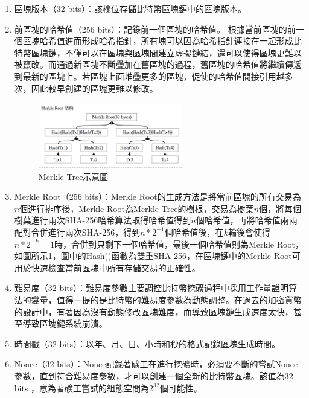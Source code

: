 				\begin{enumerate}
				\item 區塊版本（32 bits）：該欄位存儲比特幣區塊鏈中的區塊版本。
				\item 前區塊的哈希值（256 bits）：記錄前一個區塊的哈希值。 根據當前區塊的前一個區塊哈希值進而形成哈希指針，所有塊可以因為哈希指針連接在一起形成比特幣區塊鏈，不僅可以在區塊與區塊間建立虛擬鏈結，還可以使得區塊更難以被竄改。而通過新區塊不斷疊加在舊區塊的過程，舊區塊的哈希值將繼續傳遞到最新的區塊上。若區塊上面堆疊更多的區塊，促使的哈希值間接引用越多次，因此較早創建的區塊更難以修改。

				\begin{figure}[!htbp]
					\centering
					\includegraphics[width = 0.6\textwidth]{MerkleRoot.png}
					\caption{Merkle Tree示意圖}\label{MerkleRoot}
				\end{figure}

				\item Merkle Root（256 bits）：Merkle Root的生成方法是將當前區塊的所有交易為$n$個進行排序後，Merkle Root為Merkle Tree的樹根，交易為樹葉$n$個，將每個樹葉進行兩次SHA-256哈希算法取得哈希值得到$n$個哈希值，再將哈希值兩兩配對合併進行兩次SHA-256，得到$n*2^{-1}$個哈希值後，在$k$輪後會使得$n*2^{-k}=1$時，合併到只剩下一個哈希值，最後一個哈希值則為Merkle Root，如圖所示\ref{MerkleRoot}，圖中的Hash()函數為雙重SHA-256，在區塊鏈中的Merkle Root可用於快速檢查當前區塊中所有存儲交易的正確性。

				

				\item 難易度（32 bits）：難易度參數主要調控比特幣挖礦過程中採用工作量證明算法的變量，值得一提的是比特幣的難易度參數為動態調整。在過去的加密貨幣的設計中，有著因為沒有動態修改區塊難度，而導致區塊鏈生成速度太快，甚至導致區塊鏈系統崩潰。
				\item 時間戳（32 bits）：以年、月、日、小時和秒的格式記錄區塊生成時間。
				\item Nonce（32 bits）：Nonce記錄著礦工在進行挖礦時，必須要不斷的嘗試Nonce參數，直到符合難易度參數，才可以創建一個全新的比特幣區塊。該值為32 bits ，意為著礦工嘗試的組態空間為$2^{32}$個可能性。
				\end{enumerate}
				
